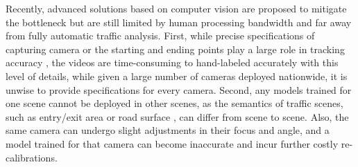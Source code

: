 Recently, advanced solutions based on computer vision
are proposed to mitigate the bottleneck
but are still limited by human processing bandwidth and far away from fully automatic traffic analysis.
First, while precise specifications of capturing camera or the starting and ending points play a large role in tracking accuracy \cite{yanziVehicleTracker,tamersoy2009robust,rodriguez2010adaptive,mishra2013video,cheng2011intelligent,corral2017slot}, 
the videos are time-consuming to hand-labeled accurately with this level of details,
while given a large number of cameras deployed nationwide, it is unwise to provide specifications for every camera.
%
Second,
any models trained for one scene cannot be deployed in other scenes,
as the semantics of traffic scenes, such as entry/exit area \cite{tamersoy2009robust,rodriguez2010adaptive} or road surface \cite{bas2007automatic}, can differ from scene to scene. 
Also, the same camera can undergo slight adjustments in their focus and angle, and a model trained for that camera can become inaccurate and incur further costly re-calibrations.



